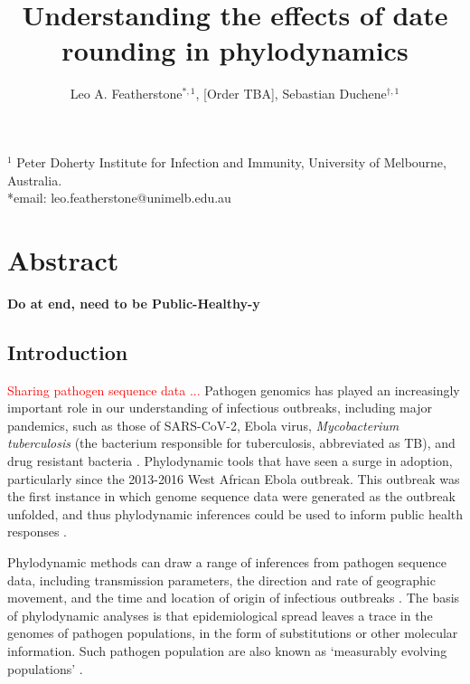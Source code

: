 \documentclass{article}
\title{Understanding the effects of date rounding in phylodynamics}
\author{Leo A. Featherstone$^{\ast,1}$, [Order TBA], Sebastian Duchene$^{\dagger,1}$}
\begin{document}
\maketitle
\linenumbers
$^{1}$ Peter Doherty Institute for Infection and Immunity, University of Melbourne, Australia.\\
*email: leo.featherstone@unimelb.edu.au

\section*{Abstract}
\textbf{Do at end, need to be Public-Healthy-y}

\begin{spacing}{1.5}
\section*{Introduction}
\textcolor{red}{Sharing pathogen sequence data ...}
Pathogen genomics has played an increasingly important role in our understanding of infectious outbreaks, including major pandemics, such as those of SARS-CoV-2, Ebola virus, \textit{Mycobacterium tuberculosis} (the bacterium responsible for tuberculosis, abbreviated as TB), and drug resistant bacteria \citep{lancet2021genomic}. Phylodynamic tools that have seen a surge in adoption, particularly since the 2013-2016 West African Ebola outbreak. This outbreak was the first instance in which genome sequence data were generated as the outbreak unfolded, and thus phylodynamic inferences could be used to inform public health responses \citep{mbala2019medical}.

Phylodynamic methods can draw a range of inferences from pathogen sequence data, including transmission parameters, the direction and rate of geographic movement, and the time and location of origin of infectious outbreaks \citep{featherstone2022epidemiological, attwood2022phylogenetic, du2015getting}. The basis of phylodynamic analyses is that epidemiological spread leaves a trace in the genomes of pathogen populations, in the form of substitutions or other molecular information. Such pathogen population are also known as `measurably evolving populations' \citep{drummond2003measurably, biek_measurably_2015}.


\end{spacing}
\end{document}

